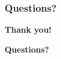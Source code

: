 \documentclass[10pt,utf8]{beamer}
\begin{document}
\begin{frame}
    \frametitle{Questions?}
    \centering
     \textbf{\Huge{Thank you!}}
    
    \vspace{1.5cm}
    
    \textbf{\Huge{Questions?}}
    
    \vspace{1cm}
\end{frame}


\end{document}
